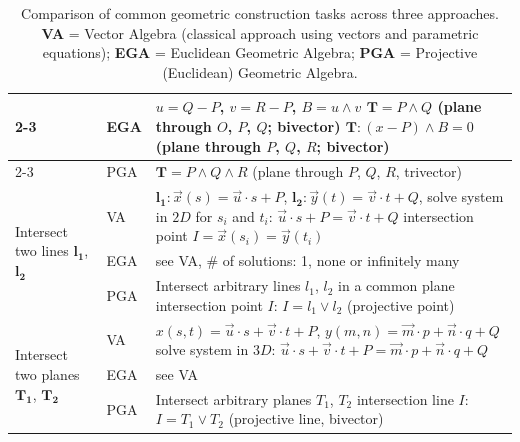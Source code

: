 \begin{table}[H]
{\begin{tabular}{|p{\cwApp}|p{\cwTag}|p{\cwDesc}|}
    \cline{2-3}
    & EGA & $u = Q - P$, $v = R - P$, $B = u \wedge v$ \newline
    $\bm{T} = P \wedge Q$ (plane through $O$, $P$, $Q$; bivector) \newline
    $\bm{T}\colon (x-P) \wedge B = 0$ (plane through $P$, $Q$, $R$; bivector)\\
    \cline{2-3}
    & PGA & $\bm{T} = P \wedge Q \wedge R$ (plane through $P$, $Q$, $R$, trivector) \\
    \hline \hline
    \multirow{3}{\cwApp}{Intersect two lines $\bm{l_1}$, $\bm{l_2}$}
    & VA  & $\bm{l_1}\colon \vec{x}(s) = \vec{u} \cdot s + P$,
    $\bm{l_2}\colon \vec{y}(t) = \vec{v} \cdot t + Q$, \newline
    solve system in $2D$ for $s_i$ and $t_i$: $\vec{u} \cdot s + P = \vec{v} \cdot t + Q$
    \newline
    intersection point $I = \vec{x}(s_i) = \vec{y}(t_i)$\\
    \cline{2-3}
    & EGA & see VA, \# of solutions: 1, none or infinitely many\\
    \cline{2-3}
    & PGA & Intersect arbitrary lines $l_1$, $l_2$ in a common plane\newline
    intersection point $I$: $I = l_1 \vee l_2$ (projective point)\\
    \hline \hline
    \multirow{3}{\cwApp}{Intersect two planes $\bm{T_1}$, $\bm{T_2}$}
    & VA  & $x(s,t) = \vec{u} \cdot s + \vec{v} \cdot t + P$,
    $y(m,n) = \vec{m} \cdot p + \vec{n} \cdot q + Q$\newline
    solve system in $3D$: $\vec{u} \cdot s + \vec{v} \cdot t + P =
    \vec{m} \cdot p + \vec{n} \cdot q + Q$\\
    \cline{2-3}
    & EGA & see VA\\
    \cline{2-3}
    & PGA & Intersect arbitrary planes $T_1$, $T_2$\newline
    intersection line $I$: $I = T_1 \vee T_2$ (projective line, bivector)\\
    \hline
\end{tabular}}%
\caption{Comparison of common geometric construction tasks across three approaches.
         \textbf{VA} = Vector Algebra (classical approach using vectors and parametric
         equations); \textbf{EGA} = Euclidean Geometric Algebra; \textbf{PGA} =
         Projective (Euclidean) Geometric Algebra.}
\end{table}

